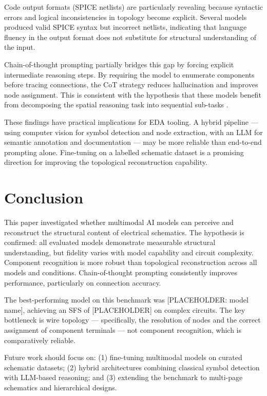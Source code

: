 \documentclass[conference]{IEEEtran}
\begin{document}
Code output formats (SPICE netlists) are particularly revealing because syntactic errors and logical inconsistencies in topology become explicit. Several models produced valid SPICE syntax but incorrect netlists, indicating that language fluency in the output format does not substitute for structural understanding of the input.

Chain-of-thought prompting partially bridges this gap by forcing explicit intermediate reasoning steps. By requiring the model to enumerate components before tracing connections, the CoT strategy reduces hallucination and improves node assignment. This is consistent with the hypothesis that these models benefit from decomposing the spatial reasoning task into sequential sub-tasks \cite{b8}.

These findings have practical implications for EDA tooling. A hybrid pipeline — using computer vision for symbol detection and node extraction, with an LLM for semantic annotation and documentation — may be more reliable than end-to-end prompting alone. Fine-tuning on a labelled schematic dataset is a promising direction for improving the topological reconstruction capability.

\section{Conclusion}

This paper investigated whether multimodal AI models can perceive and reconstruct the structural content of electrical schematics. The hypothesis is confirmed: all evaluated models demonstrate measurable structural understanding, but fidelity varies with model capability and circuit complexity. Component recognition is more robust than topological reconstruction across all models and conditions. Chain-of-thought prompting consistently improves performance, particularly on connection accuracy.

The best-performing model on this benchmark was [PLACEHOLDER: model name], achieving an SFS of [PLACEHOLDER] on complex circuits. The key bottleneck is wire topology — specifically, the resolution of nodes and the correct assignment of component terminals — not component recognition, which is comparatively reliable.

Future work should focus on: (1) fine-tuning multimodal models on curated schematic datasets; (2) hybrid architectures combining classical symbol detection with LLM-based reasoning; and (3) extending the benchmark to multi-page schematics and hierarchical designs.
\end{document}
